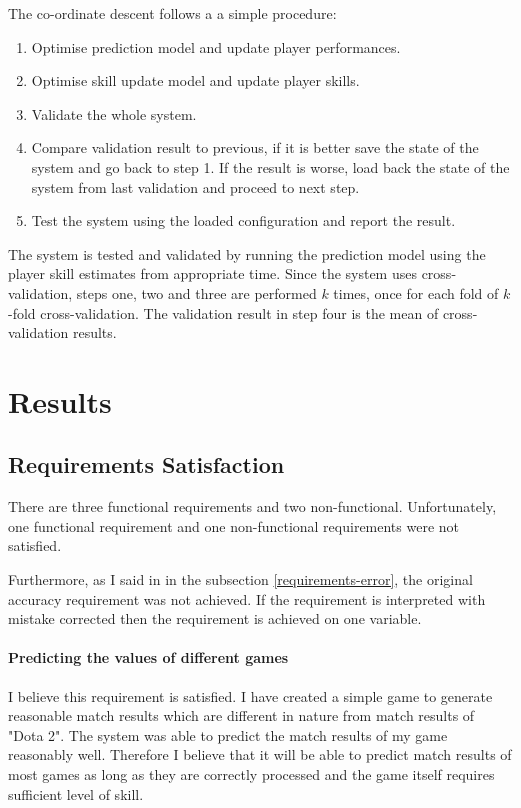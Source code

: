 \documentclass[12pt,a4paper]{book}
\begin{document}
The co-ordinate descent follows a a simple procedure:
\begin{enumerate}
\item Optimise prediction model and update player performances.
\item Optimise skill update model and update player skills.
\item Validate the whole system.
\item Compare validation result to previous, if it is better save the state of the system and go back to step 1.
If the result is worse, load back the state of the system from last validation and proceed to next step.
\item Test the system using the loaded configuration and report the result.
\end{enumerate}
The system is tested and validated by running the prediction model using the player skill estimates from appropriate time.
Since the system uses cross-validation, steps one, two and three are performed $k$ times, once for each fold of $k$-fold cross-validation.
The validation result in step four is the mean of cross-validation results.

\section{Results}
\subsection{Requirements Satisfaction}
There are three functional requirements and two non-functional.
Unfortunately, one functional requirement and one non-functional requirements were not satisfied.

Furthermore, as I said in in the subsection \ref{requirements-error}, the original accuracy requirement was not achieved.
If the requirement is interpreted with mistake corrected then the requirement is achieved on one variable.

\paragraph{Predicting the values of different games}
I believe this requirement is satisfied.
I have created a simple game to generate reasonable match results which are different in nature from match results of "Dota 2".
The system was able to predict the match results of my game reasonably well.
Therefore I believe that it will be able to predict match results of most games as long as they are correctly processed and the game itself requires sufficient level of skill.
\end{document}
